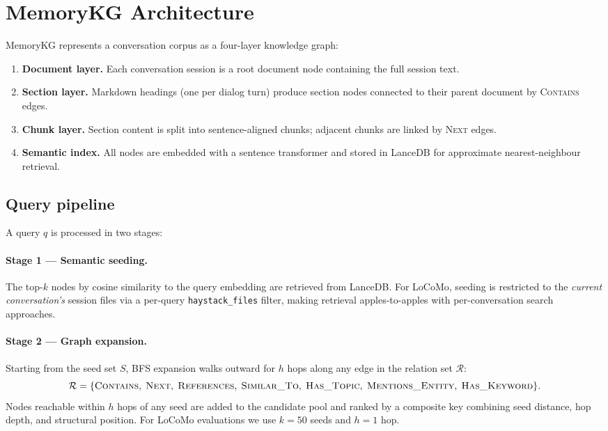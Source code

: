 \documentclass[11pt,a4paper]{article}
\begin{document}
\section{MemoryKG Architecture}
\label{sec:arch}

MemoryKG represents a conversation corpus as a four-layer knowledge graph:

\begin{enumerate}
  \item \textbf{Document layer.} Each conversation session is a root document
        node containing the full session text.
  \item \textbf{Section layer.} Markdown headings (one per dialog turn) produce
        section nodes connected to their parent document by
        \textsc{Contains} edges.
  \item \textbf{Chunk layer.} Section content is split into sentence-aligned
        chunks; adjacent chunks are linked by \textsc{Next} edges.
  \item \textbf{Semantic index.} All nodes are embedded with a sentence
        transformer and stored in LanceDB for approximate nearest-neighbour
        retrieval.
\end{enumerate}

\subsection{Query pipeline}

A query $q$ is processed in two stages:

\paragraph{Stage 1 --- Semantic seeding.}
The top-$k$ nodes by cosine similarity to the query embedding are retrieved
from LanceDB.
For LoCoMo, seeding is restricted to the \emph{current conversation's} session
files via a per-query \texttt{haystack\_files} filter, making retrieval
apples-to-apples with per-conversation search approaches.

\paragraph{Stage 2 --- Graph expansion.}
Starting from the seed set $S$, BFS expansion walks outward for $h$ hops along
any edge in the relation set $\mathcal{R}$:
\begin{equation*}
  \mathcal{R} = \{\textsc{Contains},\;\textsc{Next},\;\textsc{References},\;
    \textsc{Similar\_To},\;\textsc{Has\_Topic},\;\textsc{Mentions\_Entity},\;
    \textsc{Has\_Keyword}\}.
\end{equation*}
Nodes reachable within $h$ hops of any seed are added to the candidate pool
and ranked by a composite key combining seed distance, hop depth, and
structural position.
For LoCoMo evaluations we use $k{=}50$ seeds and $h{=}1$ hop.
\end{document}

